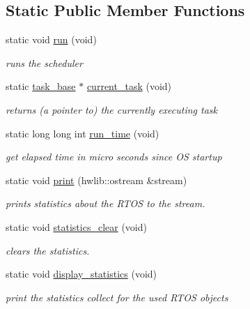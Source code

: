 \subsection*{Static Public Member Functions}
\begin{DoxyCompactItemize}
\item 
static void \hyperlink{classrtos_a1b1490e971b7908f28f7af9cfb18e5aa}{run} (void)\hypertarget{classrtos_a1b1490e971b7908f28f7af9cfb18e5aa}{}\label{classrtos_a1b1490e971b7908f28f7af9cfb18e5aa}

\begin{DoxyCompactList}\small\item\em runs the scheduler \end{DoxyCompactList}\item 
static \hyperlink{classrtos_1_1task__base}{task\+\_\+base} $\ast$ \hyperlink{classrtos_aebecb7a849f7d692fea474aae864ccc2}{current\+\_\+task} (void)\hypertarget{classrtos_aebecb7a849f7d692fea474aae864ccc2}{}\label{classrtos_aebecb7a849f7d692fea474aae864ccc2}

\begin{DoxyCompactList}\small\item\em returns (a pointer to) the currently executing task \end{DoxyCompactList}\item 
static long long int \hyperlink{classrtos_a9f271842ab57becb8d51b248cb000ebb}{run\+\_\+time} (void)\hypertarget{classrtos_a9f271842ab57becb8d51b248cb000ebb}{}\label{classrtos_a9f271842ab57becb8d51b248cb000ebb}

\begin{DoxyCompactList}\small\item\em get elapsed time in micro seconds since OS startup \end{DoxyCompactList}\item 
static void \hyperlink{classrtos_a89f20236423a5523ee6630613bf3d294}{print} (hwlib\+::ostream \&stream)\hypertarget{classrtos_a89f20236423a5523ee6630613bf3d294}{}\label{classrtos_a89f20236423a5523ee6630613bf3d294}

\begin{DoxyCompactList}\small\item\em prints statistics about the R\+T\+OS to the stream. \end{DoxyCompactList}\item 
static void \hyperlink{classrtos_ac72c2b921526d55e1c7557acefdec823}{statistics\+\_\+clear} (void)
\begin{DoxyCompactList}\small\item\em clears the statistics. \end{DoxyCompactList}\item 
static void \hyperlink{classrtos_a678def9714d83696d5b174e45481139a}{display\+\_\+statistics} (void)\hypertarget{classrtos_a678def9714d83696d5b174e45481139a}{}\label{classrtos_a678def9714d83696d5b174e45481139a}

\begin{DoxyCompactList}\small\item\em print the statistics collect for the used R\+T\+OS objects \end{DoxyCompactList}\end{DoxyCompactItemize}

